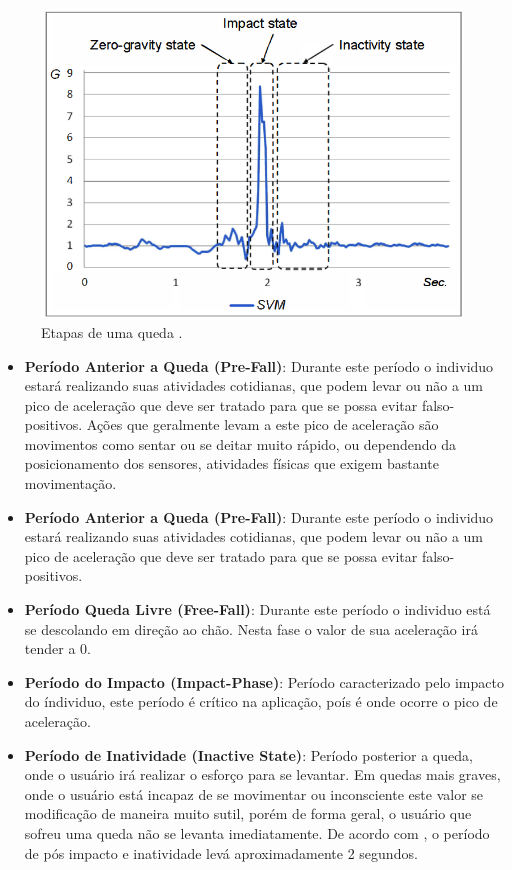 \begin{figure}[ht]
	\centering
	\includegraphics[scale=0.4]{imagens/fall_states.png}
	\caption{Etapas de uma queda \citep{hsieh2014wrist}.}
	\label{fig:fall_states}
\end{figure} 


\begin{itemize}
	\item{\textbf{Período Anterior a Queda (Pre-Fall)}: Durante este período o individuo estará realizando suas atividades cotidianas, que podem levar ou não a um pico de aceleração que deve ser tratado para que se possa evitar falso-positivos. Ações que geralmente levam a este pico de aceleração são movimentos como sentar ou se deitar muito rápido, ou dependendo da posicionamento dos sensores, atividades físicas que exigem bastante movimentação. }
	
	\item{\textbf{Período Anterior a Queda (Pre-Fall)}: Durante este período o individuo estará realizando suas atividades cotidianas, que podem levar ou não a um pico de aceleração que deve ser tratado para que se possa evitar falso-positivos. }
	
	\item{\textbf{Período Queda Livre (Free-Fall)}: Durante este período o individuo está se descolando em direção ao chão. Nesta fase o valor de sua aceleração irá tender a 0.  }
	
	\item{\textbf{Período do Impacto (Impact-Phase)}: Período caracterizado pelo impacto do índividuo, este período é crítico na aplicação, poís é onde ocorre o pico de aceleração. }
	
	\item{\textbf{Período de Inatividade (Inactive State)}: Período posterior a queda, onde o usuário irá realizar o esforço para se levantar. Em quedas mais graves, onde o usuário está incapaz de se movimentar ou inconsciente este valor se modificação de maneira muito sutil, porém de forma geral, o usuário que sofreu uma queda não se levanta imediatamente. De acordo com \cite{mehner2013location}, o período de pós impacto e inatividade levá aproximadamente 2 segundos.  }
	
\end{itemize}


